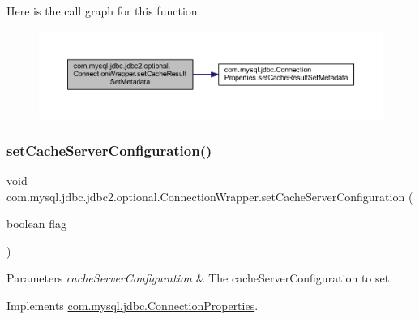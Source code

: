 Here is the call graph for this function\+:
\nopagebreak
\begin{figure}[H]
\begin{center}
\leavevmode
\includegraphics[width=350pt]{classcom_1_1mysql_1_1jdbc_1_1jdbc2_1_1optional_1_1_connection_wrapper_a549d3499e7fd8015aa2d761651d9f490_cgraph}
\end{center}
\end{figure}
\mbox{\label{classcom_1_1mysql_1_1jdbc_1_1jdbc2_1_1optional_1_1_connection_wrapper_acae485e2428a7a687985cf493daa6dc1}} 
\subsubsection{\texorpdfstring{set\+Cache\+Server\+Configuration()}{setCacheServerConfiguration()}}
{\footnotesize\ttfamily void com.\+mysql.\+jdbc.\+jdbc2.\+optional.\+Connection\+Wrapper.\+set\+Cache\+Server\+Configuration (\begin{DoxyParamCaption}\item[{boolean}]{flag }\end{DoxyParamCaption})}


\begin{DoxyParams}{Parameters}
{\em cache\+Server\+Configuration} & The cache\+Server\+Configuration to set. \\
\hline
\end{DoxyParams}


Implements \mbox{\hyperlink{interfacecom_1_1mysql_1_1jdbc_1_1_connection_properties_a1c4d96777532b47bfa433c3083557cae}{com.\+mysql.\+jdbc.\+Connection\+Properties}}.

